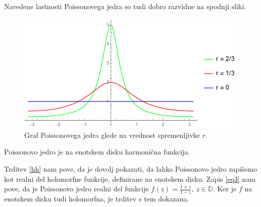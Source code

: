 \documentclass[mat1, tisk]{fmfdelo}
\begin{document}
    Navedene lastnosti Poissonovega jedra so tudi dobro razvidne na spodnji sliki. 

    \begin{figure}[H]
        \begin{center}
        \includegraphics[width=\linewidth]{grafi.png}
        \caption{Graf Poissonovega jedra glede na vrednost spremenljivke $r$.}
        \end{center}    
    \end{figure}

    \begin{trditev}
        \label{poiss_harm}
        Poissonovo jedro je na enotskem disku harmonična funkcija. 
    \end{trditev}
    \begin{dokaz}
        Trditev \ref{hh} nam pove, da je dovolj pokazati, da lahko Poissonovo jedro zapišemo kot realni del holomorfne funkcije, definirane na enotskem disku.
        Zapis \eqref{eq3} nam pove, da je Poissonovo jedro realni del funkcije $f(z) = \frac{1 + z}{1 - z},~z \in \mathbb{D}$. Ker je $f$ na enotskem disku tudi holomorfna, je trditev s tem dokazana. 
    \end{dokaz}
\end{document}
